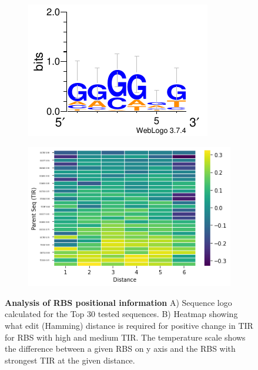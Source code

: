 \documentclass{article}
\begin{document}
\begin{figure}
     \centering
     \begin{subfigure}[b]{0.49\textwidth}
         \centering
         \includegraphics[scale=1.2]{plots/Main_Paper/TOP30_logo.pdf}
         \caption{}
     \end{subfigure}
     \hfill
     \begin{subfigure}[b]{0.49\textwidth}
         \centering
         \includegraphics[scale=0.5]{plots/Main_Paper/Hd_Heatmap.png}
         \caption{}
     \end{subfigure}
     \caption{\textbf{Analysis of RBS positional information} A) Sequence logo calculated for the Top 30 tested sequences. B) Heatmap showing what edit (Hamming) distance is required for positive change in TIR for RBS with high and medium TIR. The temperature scale shows the difference between a given RBS on y axis and the RBS with strongest TIR at the given distance.}
     \label{fig:Library characteristics}
\end{figure}
\end{document}
